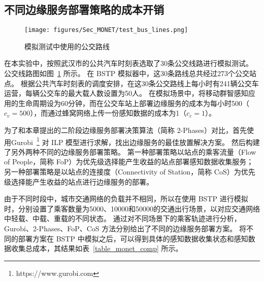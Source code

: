 \subsection{不同边缘服务部署策略的成本开销}

\begin{figure}[!b]
  \centering
  \texttt{[image: figures/Sec\_MONET/test\_bus\_lines.png]}
  \vspace{-0.5em}
  \caption{模拟测试中使用的公交路线}
  \label{Figure_test_bus_lines}
\end{figure}

在本实验中，按照武汉市的公共汽车时刻表选取了30条公交线路进行模拟测试。
公交线路图如图~\ref{Figure_test_bus_lines} 所示。
在 BSTP 模拟器中，这30条路线总共经过273个公交站点。
根据公共汽车时刻表的调度安排，在这30条公交路线上每小时有241辆公交车运营，每辆公交车的最大载人数设置为50人。
在模拟场景中，将移动群智感知应用的生命周期设为60分钟，而在公交车站上部署边缘服务的成本为每小时500（$c_v = 500$），而通过蜂窝网络上传一份感知数据的成本为1（$c_c = 1$）。

为了和本章提出的二阶段边缘服务部署决策算法（简称 2-Phases）对比，首先使用Gurobi~\footnote{https://www.gurobi.com} 对 ILP 模型进行求解，找出边缘服务的最佳放置解决方案。
然后构建了另外两种不同的边缘服务部署策略。
第一种部署策略以站点的乘客流量（Flow of People，简称 FoP）为优先级选择能产生收益的站点部署感知数据收集服务；
另一种部署策略是以站点的连接度（Connectivity of Station，简称 CoS）为优先级选择能产生收益的站点进行边缘服务的部署。

由于不同时段中，城市交通网络的负载并不相同，所以在使用 BSTP 进行模拟时，分别设置了乘客数量为5000、10000和50000的交通出行场景，以对应交通网络中轻载、中载、重载的不同状态。
通过对不同场景下的乘客轨迹进行分析，Gurobi、2-Phases、FoP、CoS 方法分别给出了不同的边缘服务部署方案。
将不同的部署方案在 BSTP 中模拟之后，可以得到具体的感知数据收集状态和感知数据收集总成本，其结果如表~\ref{table_monet_comp} 所示。

